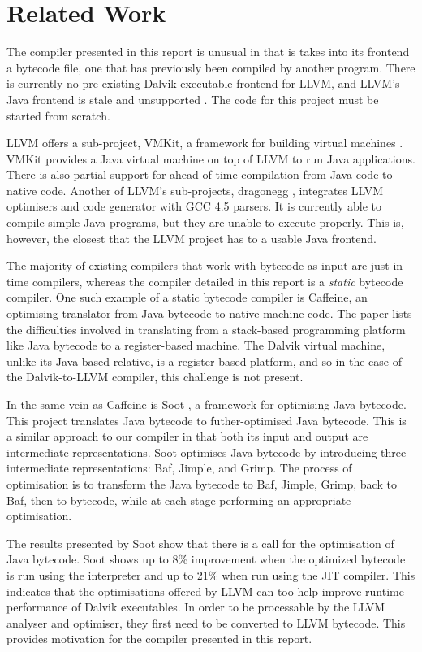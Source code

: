 \chapter{Related Work}
\label{chap:related}

The compiler presented in this report is unusual in that is takes into its frontend a bytecode file, one that has previously been compiled by another program. There is currently no pre-existing Dalvik executable frontend for LLVM, and LLVM's Java frontend is stale and unsupported \cite{llvm_fe}. The code for this project must be started from scratch.

LLVM offers a sub-project, VMKit, a framework for building virtual machines \cite{geoffray10vmkit}. VMKit provides a Java virtual machine on top of LLVM to run Java applications. There is also partial support for ahead-of-time compilation from Java code to native code. Another of LLVM's sub-projects, dragonegg \cite{dragonegg}, integrates LLVM optimisers and code generator with GCC 4.5 parsers. It is currently able to compile simple Java programs, but they are unable to execute properly. This is, however, the closest that the LLVM project has to a usable Java frontend.

The majority of existing compilers that work with bytecode as input are just-in-time compilers, whereas the compiler detailed in this report is a \emph{static} bytecode compiler. One such example of a static bytecode compiler is Caffeine\cite{Hsieh:1996:JBN:243846.243864}, an optimising translator from Java bytecode to native machine code. The paper lists the difficulties involved in translating from a stack-based programming platform like Java bytecode to a register-based machine. The Dalvik virtual machine, unlike its Java-based relative, is a register-based platform, and so in the case of the Dalvik-to-LLVM compiler, this challenge is not present.

In the same vein as Caffeine is Soot \cite{Vallee-Rai:1999:SJB:781995.782008}, a framework for optimising Java bytecode. This project translates Java bytecode to futher-optimised Java bytecode. This is a similar approach to our compiler in that both its input and output are intermediate representations. Soot optimises Java bytecode by introducing three intermediate representations: Baf, Jimple, and Grimp. The process of optimisation is to transform the Java bytecode to Baf, Jimple, Grimp, back to Baf, then to bytecode, while at each stage performing an appropriate optimisation.

The results presented by Soot show that there is a call for the optimisation of Java bytecode. Soot shows up to 8\% improvement when the optimized bytecode is run using the interpreter and up to 21\% when run using the JIT compiler. This indicates that the optimisations offered by LLVM can too help improve runtime performance of Dalvik executables. In order to be processable by the LLVM analyser and optimiser, they first need to be converted to LLVM bytecode. This provides motivation for the compiler presented in this report.


